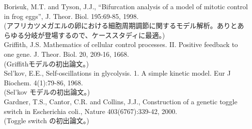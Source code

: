 \noindent Borisuk, M.T. and Tyson, J.J., “Bifurcation analysis of a model of mitotic control in frog eggs”, J. Theor. Biol. 195:69-85, 1998.\\
(アフリカツメガエルの卵における細胞周期調節に関するモデル解析。ありとあらゆる分岐が登場するので、ケーススタディに最適。)\\

\noindent Griffith, J.S. Mathematics of cellular control processes. II. Positive feedback to one gene. J. Theor. Biol. 20, 209-16, 1668.\\
(Griffithモデルの初出論文。)\\

\noindent Sel'kov, E.E., Self-oscillations in glycolysis. 1. A simple kinetic model. Eur J Biochem. 4(1):79-86, 1968.\\
(Sel'kov モデルの初出論文。)\\

\noindent Gardner, T.S., Cantor, C.R. and Collins, J.J., Construction of a genetic toggle switch in Escherichia coli., Nature 403(6767):339-42, 2000.\\
(Toggle switch の初出論文。)\\


%
